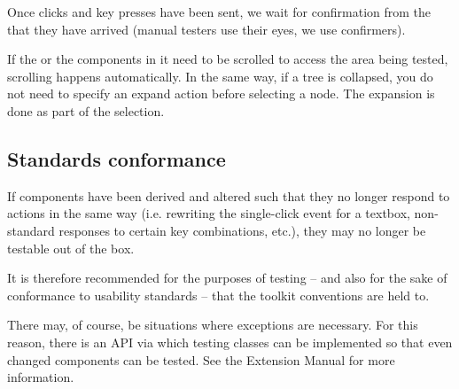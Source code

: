 Once clicks and key presses have been sent, we wait for confirmation from the \gdaut{} that they have arrived (manual testers use their eyes, we use confirmers). 

If the \gdaut{} or the components in it need to be scrolled to access the area being tested, scrolling happens automatically. In the same way, if a tree is collapsed, you do not need to specify an expand action before selecting a node. The expansion is done as part of the selection. 


\subsection{Standards conformance}
If components have been
derived and altered such that they no longer respond to actions in the
same way (i.e. rewriting the single-click event for a textbox,
non-standard responses to certain key combinations, etc.), they may no longer be
testable out of the box.

It is therefore recommended for the purposes of testing  --
and also for the sake of conformance to usability standards -- that
the toolkit conventions are held to.

There may, of course, be situations where exceptions are necessary. For this reason, there is an API via which testing classes can be implemented so that even changed components can be tested. See the Extension Manual for more information. 

